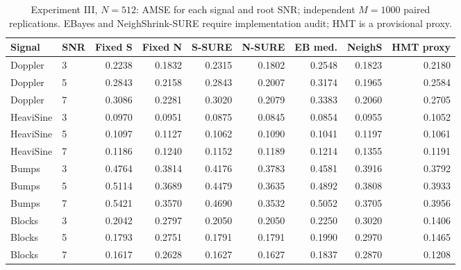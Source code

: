 \documentclass[11pt]{article}
\numberwithin{equation}{section}
\begin{document}
\begin{table}[H]
\centering\small
\caption{Experiment III, $N=512$: AMSE for each signal and root SNR; independent $M=1000$ paired replications. EBayes and NeighShrink-SURE require implementation audit; HMT is a provisional proxy.}
\label{tab:s5-e3-amse-512}
\setlength{\tabcolsep}{5pt}
\scriptsize
\setlength{\tabcolsep}{3pt}
\begin{tabular}{llrrrrrrr}
\toprule
Signal & SNR & Fixed S & Fixed N & S-SURE & N-SURE & EB med. & NeighS & HMT proxy \\
\midrule
Doppler & 3 & 0.2238 & 0.1832 & 0.2315 & 0.1802 & 0.2548 & 0.1823 & 0.2180 \\
Doppler & 5 & 0.2843 & 0.2158 & 0.2843 & 0.2007 & 0.3174 & 0.1965 & 0.2584 \\
Doppler & 7 & 0.3086 & 0.2281 & 0.3020 & 0.2079 & 0.3383 & 0.2060 & 0.2705 \\
HeaviSine & 3 & 0.0970 & 0.0951 & 0.0875 & 0.0845 & 0.0854 & 0.0955 & 0.1052 \\
HeaviSine & 5 & 0.1097 & 0.1127 & 0.1062 & 0.1090 & 0.1041 & 0.1197 & 0.1061 \\
HeaviSine & 7 & 0.1186 & 0.1240 & 0.1152 & 0.1189 & 0.1214 & 0.1355 & 0.1191 \\
Bumps & 3 & 0.4764 & 0.3814 & 0.4176 & 0.3783 & 0.4581 & 0.3916 & 0.3792 \\
Bumps & 5 & 0.5114 & 0.3689 & 0.4479 & 0.3635 & 0.4892 & 0.3808 & 0.3933 \\
Bumps & 7 & 0.5421 & 0.3570 & 0.4690 & 0.3532 & 0.5052 & 0.3705 & 0.3956 \\
Blocks & 3 & 0.2042 & 0.2797 & 0.2050 & 0.2050 & 0.2250 & 0.3020 & 0.1406 \\
Blocks & 5 & 0.1793 & 0.2751 & 0.1791 & 0.1791 & 0.1990 & 0.2970 & 0.1465 \\
Blocks & 7 & 0.1617 & 0.2628 & 0.1627 & 0.1627 & 0.1837 & 0.2870 & 0.1208 \\
\bottomrule
\end{tabular}
\end{table}
\end{document}
